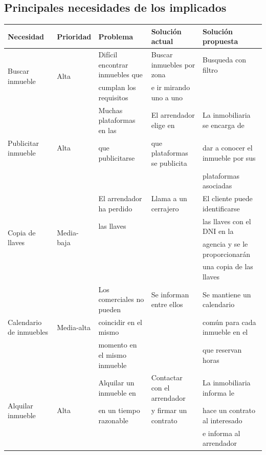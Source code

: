 \documentclass[10pt,a4paper]{article}
\begin{document}
\subsection*{Principales necesidades de los implicados}
{\footnotesize
\begin{tabular}{|l|l|l|l|l|}
\hline
{\small\textbf{Necesidad}} & {\small\textbf{Prioridad}} & {\small\textbf{Problema}} & {\small\textbf{Solución actual}} & {\small\textbf{Solución propuesta}} \\ \hline
\multirow{2}{*}{Buscar inmueble} & \multirow{2}{*}{Alta} & Difícil encontrar inmuebles que & Buscar inmuebles por zona & Busqueda con filtro \\
 & & cumplan los requisitos &  e ir mirando uno a uno & \\ \hline
\multirow{3}{*}{Publicitar inmueble} & \multirow{3}{*}{Alta} & Muchas plataformas en las & El arrendador elige en & La inmobiliaria se encarga de \\
 & & que publicitarse & que plataformas se publicita & dar a conocer el inmueble
por sus \\
 & & & & plataformas asociadas\\ \hline
\multirow{4}{*}{Copia de llaves} & \multirow{4}{*}{Media-baja} & El arrendador ha perdido & Llama a un cerrajero & El cliente puede identificarse \\
 & & las llaves & & las llaves con el DNI en la\\
 & & & &  agencia y se le proporcionarán \\
 & & & & una copia de las llaves\\ \hline
\multirow{3}{*}{Calendario de inmuebles} & \multirow{3}{*}{Media-alta} & Los comerciales no pueden & Se informan entre ellos & Se mantiene un calendario\\
 & & coincidir en el mismo & &  común para cada inmueble en
el\\
 & & momento en el mismo inmueble & & que reservan horas\\ \hline
\multirow{3}{*}{Alquilar inmueble} & \multirow{3}{*}{Alta} & Alquilar un inmueble en & Contactar con el arrendador & La inmobiliaria informa le \\
 & & en un tiempo razonable & y firmar un contrato & hace un contrato al interesado\\
 & & & & e informa al arrendador \\ \hline
\end{tabular}}
\end{document}
